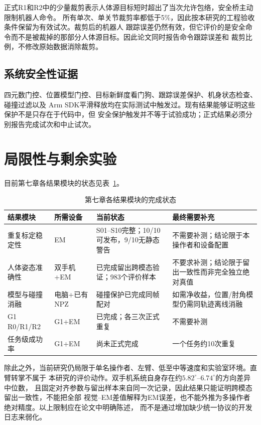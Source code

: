 正式R1和R2中的少量裁剪表示人体源目标短时超出了当次允许包络，安全桥主动限制机器人命令。
所有单次、单关节裁剪率都低于5\%，因此按本研究的工程验收条件保留为有效试次。裁剪后的机器人
跟踪误差仍然有效，但它评价的是安全命令而不是被裁掉的那部分人体源目标。因此论文同时报告命令跟踪误差和
裁剪比例，不修改原始数据消除裁剪。

\subsection{系统安全性证据}

四元数门控、位置模型门控、目标新鲜度看门狗、跟踪误差保护、机身状态检查、碰撞过滤以及
Arm SDK平滑释放均在实际测试中触发过。现有结果能够证明这些保护不是只存在于代码中，但
安全保护触发并不等于试验成功；正式结果必须分别报告完成试次和中止试次。

\section{局限性与剩余实验}
\label{sec:ch7_limitations_remaining}

目前第七章各结果模块的状态见表~\ref{tab:ch7_remaining_modules}。

\begin{table}[htbp]
  \centering
  \scriptsize
  \caption{第七章各结果模块的完成状态}
  \label{tab:ch7_remaining_modules}
  \begin{tabularx}{\linewidth}{@{}lXXX@{}}
    \toprule
    结果模块 & 所需设备 & 当前状态 & 最终需要补充 \\
    \midrule
    重复标定稳定性 & EM & S01--S10完整；10/10可发布，9/10无静态警告
      & 不需要补测；结论限于本操作者和设备配置 \\
    人体姿态准确性 & 双手机+EM & 已完成留出跨模态验证；983个评价样本
      & 不要求补测；结论限于留出一致性而非完全独立绝对真值 \\
    模型与碰撞消融 & 电脑+已有NPZ & 碰撞保护已完成同帧配对
      & 如需净收益，位置/肘角模型仍需同轨迹离线消融 \\
    G1 R0/R1/R2 & G1+EM & 已完成；各三次正式重复
      & 不需要补测 \\
    任务级成功率 & G1+EM & 尚未正式完成
      & 一个任务约10次重复 \\
    \bottomrule
  \end{tabularx}
\end{table}

除此之外，当前研究仍局限于单名操作者、左臂、低至中等速度和实验室环境。直臂转掌不属于
本研究的评价动作。双手机系统自身存在约$5.82^\circ$--$6.74^\circ$的方向差异中位数，
且固定对齐参数与留出样本来自同一次记录，因此结果只能证明跨模态留出一致性，不能把全部
视觉--EM差值解释为EM误差，也不能外推为多操作者绝对精度。以上限制应在论文中明确陈述，
而不是通过增加缺少统一协议的开发日志来弱化。

